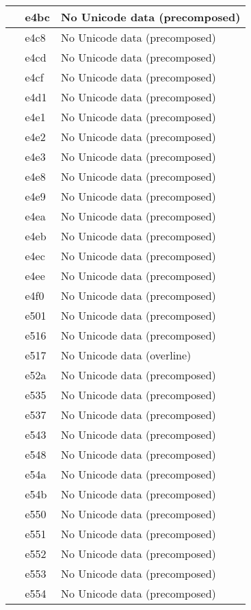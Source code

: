 \documentclass[12pt,letterpaper,openany]{book}
\begin{document}
\begin{center}
\begin{supertabular}{|m{0.25in}|m{0.5in}|m{4in}|}
 & e4bc & No Unicode data (precomposed)\\\hline
 & e4c8 & No Unicode data (precomposed)\\\hline
 & e4cd & No Unicode data (precomposed)\\\hline
 & e4cf & No Unicode data (precomposed)\\\hline
 & e4d1 & No Unicode data (precomposed)\\\hline
 & e4e1 & No Unicode data (precomposed)\\\hline
 & e4e2 & No Unicode data (precomposed)\\\hline
 & e4e3 & No Unicode data (precomposed)\\\hline
 & e4e8 & No Unicode data (precomposed)\\\hline
 & e4e9 & No Unicode data (precomposed)\\\hline
 & e4ea & No Unicode data (precomposed)\\\hline
 & e4eb & No Unicode data (precomposed)\\\hline
 & e4ec & No Unicode data (precomposed)\\\hline
 & e4ee & No Unicode data (precomposed)\\\hline
 & e4f0 & No Unicode data (precomposed)\\\hline
 & e501 & No Unicode data (precomposed)\\\hline
 & e516 & No Unicode data (precomposed)\\\hline
 & e517 & No Unicode data (overline)\\\hline
 & e52a & No Unicode data (precomposed)\\\hline
 & e535 & No Unicode data (precomposed)\\\hline
 & e537 & No Unicode data (precomposed)\\\hline
 & e543 & No Unicode data (precomposed)\\\hline
 & e548 & No Unicode data (precomposed)\\\hline
 & e54a & No Unicode data (precomposed)\\\hline
 & e54b & No Unicode data (precomposed)\\\hline
 & e550 & No Unicode data (precomposed)\\\hline
 & e551 & No Unicode data (precomposed)\\\hline
 & e552 & No Unicode data (precomposed)\\\hline
 & e553 & No Unicode data (precomposed)\\\hline
 & e554 & No Unicode data (precomposed)\\\hline

\end{supertabular}
\end{center}
\end{document}
